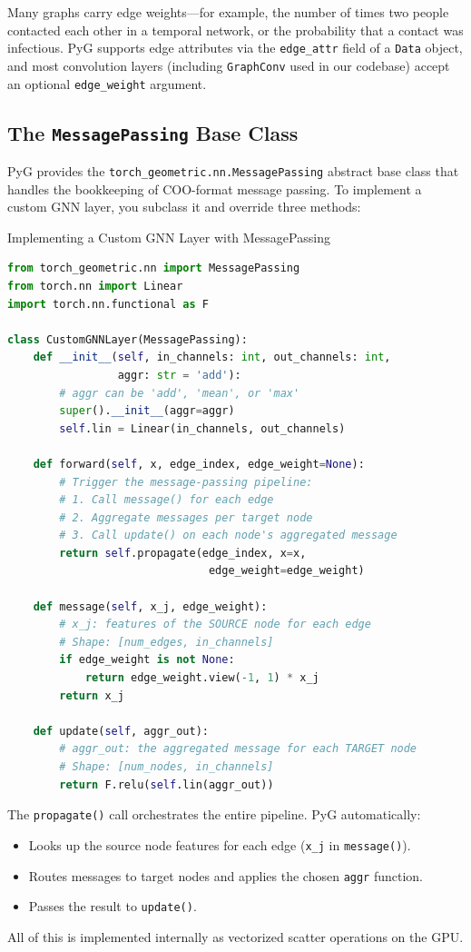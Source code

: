 Many graphs carry edge weights---for example, the number of times two people contacted each other in a temporal network, or the probability that a contact was infectious. PyG supports edge attributes via the \texttt{edge\_attr} field of a \texttt{Data} object, and most convolution layers (including \texttt{GraphConv} used in our codebase) accept an optional \texttt{edge\_weight} argument.

\subsection{The \texttt{MessagePassing} Base Class}

PyG provides the \texttt{torch\_geometric.nn.MessagePassing} abstract base class that handles the bookkeeping of COO-format message passing. To implement a custom GNN layer, you subclass it and override three methods:

\begin{codewalk}{Implementing a Custom GNN Layer with MessagePassing}
\begin{lstlisting}[language=Python]
from torch_geometric.nn import MessagePassing
from torch.nn import Linear
import torch.nn.functional as F

class CustomGNNLayer(MessagePassing):
    def __init__(self, in_channels: int, out_channels: int,
                 aggr: str = 'add'):
        # aggr can be 'add', 'mean', or 'max'
        super().__init__(aggr=aggr)
        self.lin = Linear(in_channels, out_channels)

    def forward(self, x, edge_index, edge_weight=None):
        # Trigger the message-passing pipeline:
        # 1. Call message() for each edge
        # 2. Aggregate messages per target node
        # 3. Call update() on each node's aggregated message
        return self.propagate(edge_index, x=x,
                               edge_weight=edge_weight)

    def message(self, x_j, edge_weight):
        # x_j: features of the SOURCE node for each edge
        # Shape: [num_edges, in_channels]
        if edge_weight is not None:
            return edge_weight.view(-1, 1) * x_j
        return x_j

    def update(self, aggr_out):
        # aggr_out: the aggregated message for each TARGET node
        # Shape: [num_nodes, in_channels]
        return F.relu(self.lin(aggr_out))
\end{lstlisting}

The \texttt{propagate()} call orchestrates the entire pipeline. PyG automatically:
\begin{itemize}[noitemsep]
    \item Looks up the source node features for each edge (\texttt{x\_j} in \texttt{message()}).
    \item Routes messages to target nodes and applies the chosen \texttt{aggr} function.
    \item Passes the result to \texttt{update()}.
\end{itemize}
All of this is implemented internally as vectorized scatter operations on the GPU.
\end{codewalk}

